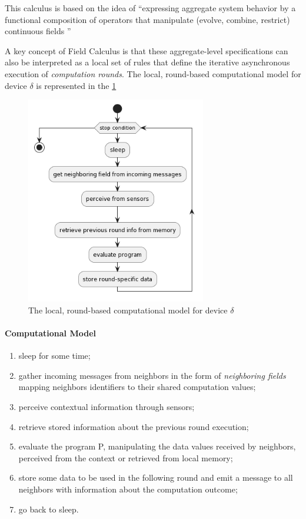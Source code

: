 This calculus is based on the idea of ``expressing aggregate system behavior by a functional composition of operators that manipulate (evolve, combine, restrict) continuous fields \cite{10.1007/978-3-642-45364-9_11}''

A key concept of Field Calculus is that these aggregate-level specifications can also be interpreted as a local set of rules that define the iterative asynchronous execution of \textit{computation rounds}.
The local, round-based computational model for device $\delta$ is represented in the \cref{fig:compmodel}

\begin{figure}[ht!]
    \centering
    \includegraphics[width=0.7\textwidth]{figures/diagrams/img/computational-model.png}
    \caption{The local, round-based computational model for device $\delta$}
    \label{fig:compmodel}
\end{figure}

\paragraph{Computational Model}
\label{par:comp-model}
\begin{enumerate}
    \item sleep for some time;
    \item gather incoming messages from neighbors in the form of \textit{neighboring fields} mapping neighbors identifiers to their shared computation values;
    \item perceive contextual information through sensors;
    \item retrieve stored information about the previous round execution;
    \item evaluate the program P, manipulating the data values received by neighbors, perceived from the context or retrieved from local memory;
    \item store some data to be used in the following round and emit a message to all neighbors with information about the computation outcome;
    \item go back to sleep.
\end{enumerate}

